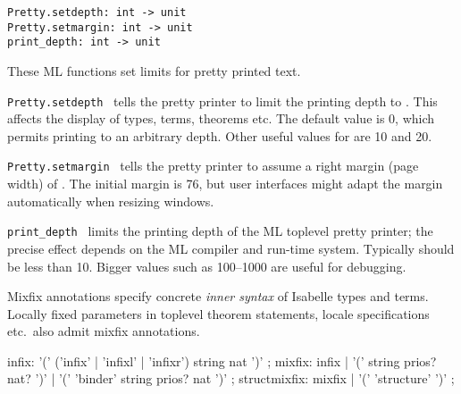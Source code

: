 \begin{isabellebody}
\begin{isamarkuptext}
\begin{description}
  \end{description}%
\end{isamarkuptext}%
\isamarkuptrue%
%
\isamarkuptrue%
%
\begin{isamarkuptext}%
\begin{mldecls}
    \verb|Pretty.setdepth: int -> unit| \\
    \verb|Pretty.setmargin: int -> unit| \\
    \verb|print_depth: int -> unit| \\
  \end{mldecls}

  These ML functions set limits for pretty printed text.

  \begin{description}

  \item \verb|Pretty.setdepth|~ tells the pretty printer to
  limit the printing depth to .  This affects the display of
  types, terms, theorems etc.  The default value is 0, which permits
  printing to an arbitrary depth.  Other useful values for 
  are 10 and 20.

  \item \verb|Pretty.setmargin|~ tells the pretty printer to
  assume a right margin (page width) of .  The initial margin
  is 76, but user interfaces might adapt the margin automatically when
  resizing windows.

  \item \verb|print_depth|~ limits the printing depth of the
  ML toplevel pretty printer; the precise effect depends on the ML
  compiler and run-time system.  Typically  should be less
  than 10.  Bigger values such as 100--1000 are useful for debugging.

  \end{description}%
\end{isamarkuptext}%
\isamarkuptrue%
%
\isamarkuptrue%
%
\begin{isamarkuptext}%
Mixfix annotations specify concrete \emph{inner syntax} of
  Isabelle types and terms.  Locally fixed parameters in toplevel
  theorem statements, locale specifications etc.\ also admit mixfix
  annotations.

  \begin{rail}
    infix: '(' ('infix' | 'infixl' | 'infixr') string nat ')'
    ;
    mixfix: infix | '(' string prios? nat? ')' | '(' 'binder' string prios? nat ')'
    ;
    structmixfix: mixfix | '(' 'structure' ')'
    ;


\end{rail}
\end{isamarkuptext}
\end{isabellebody}
